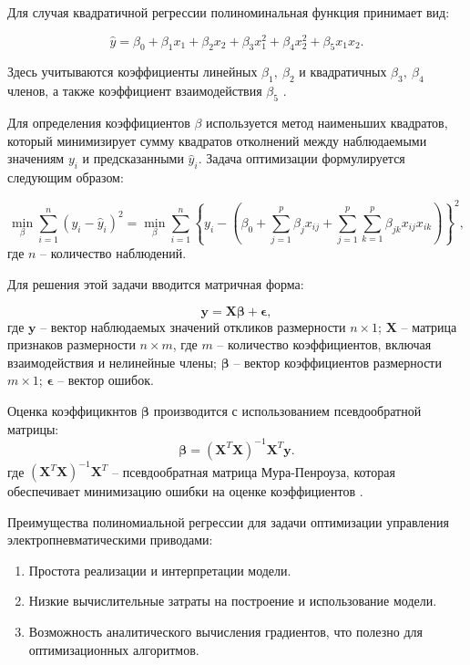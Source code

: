 Для случая квадратичной регрессии полиноминальная функция принимает вид:

\begin{equation}
    \hat{y} = \beta_0 + \beta_1 x_1 + \beta_2 x_2 + \beta_3 x_1^2
    + \beta_4 x_2^2 + \beta_5 x_1 x_2.
\end{equation}

Здесь учитываются коэффициенты линейных $\beta_1,~\beta_2$ и квадратичных $\beta_3,~\beta_4$ членов,
а также коэффициент взаимодействия $\beta_5$ \cite{heiberger2009polynomial}.

Для определения коэффициентов $\beta$ используется метод наименьших квадратов,
который минимизирует сумму квадратов отколнений между наблюдаемыми значениям $y_i$
и предсказанными $\hat{y}_i$. Задача оптимизации формулируется следующим образом:

\begin{equation}
    \min_{\beta} \sum_{i=1}^{n} (y_i - \hat{y}_i)^2 =
    \min_{\beta} \sum_{i=1}^{n} \left\{
    y_i - \left(\beta_0 + \sum_{j=1}^{p} \beta_j x_{ij}
    + \sum_{j=1}^{p} \sum_{k=1}^{p} \beta_{jk} x_{ij} x_{ik}
    \right)
    \right\}^2,
\end{equation}
где $n$ -- количество наблюдений.

Для решения этой задачи вводится матричная форма:

\begin{equation}
    \mathbf{y} = \mathbf{X} \boldsymbol{\beta} + \boldsymbol{\epsilon},
\end{equation}
где $\mathbf{y}$ -- вектор наблюдаемых значений откликов размерности $n \times 1$;
$\mathbf{X}$ -- матрица признаков размерности $n \times m$, где $m$ -- количество коэффициентов,
включая взаимодействия и нелинейные члены;
$\boldsymbol{\beta}$ -- вектор коэффициентов размерности $m \times 1$;
$\boldsymbol{\epsilon}$ -- вектор ошибок.

Оценка коэффицикнтов $\boldsymbol{\beta}$ производится с использованием псевдообратной матрицы:
\begin{equation}
    \boldsymbol{\beta} = (\mathbf{X}^T \mathbf{X})^{-1} \mathbf{X}^T \mathbf{y}.
\end{equation}
где $(\mathbf{X}^T \mathbf{X})^{-1} \mathbf{X}^T$ -- псевдообратная матрица Мура-Пенроуза,
которая обеспечивает минимизацию ошибки на оценке коэффициентов \cite{meyer2009matrix}.

Преимущества полиномиальной регрессии для задачи оптимизации управления электропневматическими приводами:
\begin{enumerate}
    \item Простота реализации и интерпретации модели.
    \item Низкие вычислительные затраты на построение и использование модели.
    \item Возможность аналитического вычисления градиентов, что полезно для оптимизационных алгоритмов.
\end{enumerate}

